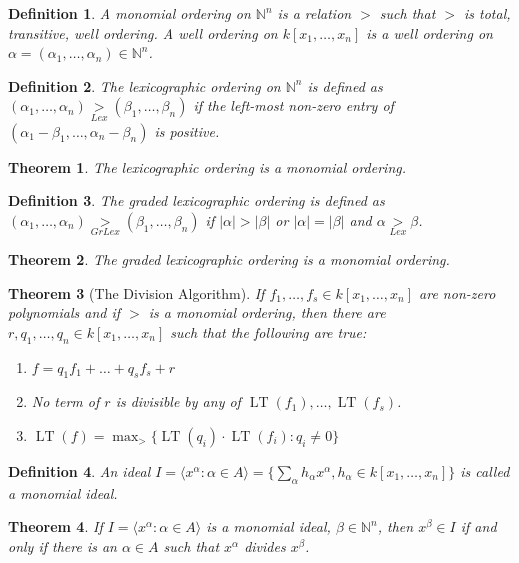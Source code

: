 \documentclass[oneside]{book}
\theoremstyle{mystyle}
\newtheorem{theorem}{Theorem}[section]
\newtheorem{definition}{Definition}[section]
\DeclareMathOperator{\LT}{LT}
\begin{document}
\begin{definition}
A monomial ordering on $\mathbb{N}^n$ is a relation $>$ such that $>$ is total, transitive, well ordering. A well ordering on $k[x_1,\hdots ,x_n]$ is a well ordering on $\alpha = (\alpha_1,\hdots, \alpha_n) \in \mathbb{N}^n$.
\end{definition}
\begin{definition}
The lexicographic ordering on $\mathbb{N}^n$ is defined as $(\alpha_1,\hdots, \alpha_n) \underset{Lex}{>} (\beta_1,\hdots, \beta_n)$ if the left-most non-zero entry of $(\alpha_1-\beta_1,\hdots, \alpha_n-\beta_n)$ is positive.
\end{definition}
\begin{theorem}
The lexicographic ordering is a monomial ordering.
\end{theorem}
\begin{definition}
The graded lexicographic ordering is defined as $(\alpha_1,\hdots, \alpha_n) \underset{GrLex}{>}(\beta_1,\hdots, \beta_n)$ if $|\alpha|>|\beta|$ or $|\alpha| = |\beta|$ and $\alpha \underset{Lex}{>}\beta$.
\end{definition}
\begin{theorem}
The graded lexicographic ordering is a monomial ordering.
\end{theorem}
\begin{theorem}[The Division Algorithm]
If $f_1,\hdots, f_s\in k[x_1,\hdots ,x_n]$ are non-zero polynomials and if $>$ is a monomial ordering, then there are $r,q_1,\hdots, q_n\in k[x_1,\hdots ,x_n]$ such that the following are true:
\begin{enumerate}
\item $f=q_1f_1+\hdots + q_sf_s + r$
\item No term of $r$ is divisible by any of $\LT(f_1),\hdots, \LT(f_s)$.
\item $\LT(f) = \max_{>}\{\LT(q_i)\cdot \LT(f_i):q_i \ne 0\}$
\end{enumerate}
\end{theorem}
\begin{definition}
An ideal $I = \langle x^{\alpha}: \alpha \in A\rangle = \{\sum_{\alpha} h_{\alpha} x^\alpha, h_{\alpha} \in k[x_1,\hdots ,x_n]\}$ is called a monomial ideal.
\end{definition}
\begin{theorem}
If $I = \langle x^\alpha: \alpha \in A\rangle$ is a monomial ideal, $\beta \in \mathbb{N}^n$, then $x^\beta \in I$ if and only if there is an $\alpha \in A$ such that $x^\alpha$ divides $x^\beta$.
\end{theorem}
\end{document}
